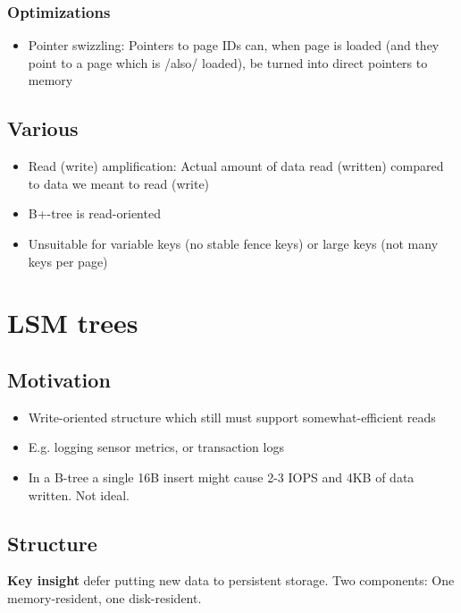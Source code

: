 \documentclass[a4paper]{scrreprt}
\begin{document}
\subsection{Optimizations}

\begin{itemize}
		\item Pointer swizzling: Pointers to page IDs can, when page is loaded
				(and they point to a page which is /also/ loaded), be turned
				into direct pointers to memory
\end{itemize}

\section{Various}

\begin{itemize}
		\item Read (write) amplification: Actual amount of data read (written)
				compared to data we meant to read (write)
		\item B+-tree is read-oriented
		\item Unsuitable for variable keys (no stable fence keys) or large keys
				(not many keys per page)
\end{itemize}

\chapter{LSM trees}

\section{Motivation}

\begin{itemize}
		\item Write-oriented structure which still must support somewhat-efficient reads
		\item E.g. logging sensor metrics, or transaction logs
		\item In a B-tree a single 16B insert might cause 2-3 IOPS and 4KB of
				data written. Not ideal.
\end{itemize}

\section{Structure}

\textbf{Key insight} defer putting new data to persistent storage. Two
components: One memory-resident, one disk-resident.
\end{document}
